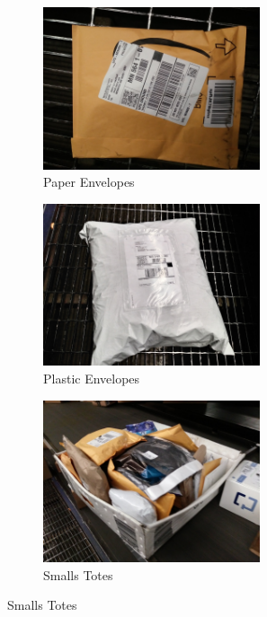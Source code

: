\documentclass[12pt]{article}
\begin{document}
\begin{figure}[H]
\begin{subfigure}{0.5\textwidth}
\centering
\includegraphics[width=0.7\textwidth]{20171221_155646.jpg} 
\caption{Paper Envelopes}
\end{subfigure}
\hfill
\begin{subfigure}{0.5\textwidth}
\centering
\includegraphics[width=0.7\textwidth]{20171221_171525_HDR.jpg} 
\caption{Plastic Envelopes}
\end{subfigure}
\hfill
\begin{subfigure}{0.5\textwidth}
\centering
\includegraphics[width=0.7\textwidth]{20171221_163150.jpg} 
\caption{Smalls Totes}
\end{subfigure}
\end{figure}
\clearpage
\end{document}
